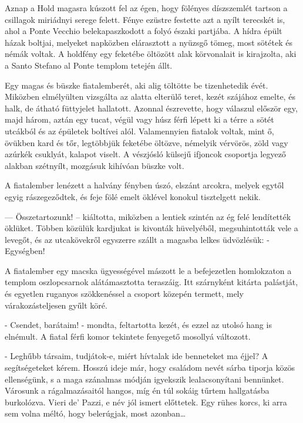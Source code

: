 \documentclass[12pt, a4paper, twoside]{report}
\theoremstyle{definition}
\theoremstyle{remark}
\begin{document}
Aznap  a  Hold  magasra  kúszott  fel  az  égen,  hogy  fölényes 
díszszemlét tartson a csillagok miriádnyi serege felett. Fénye ezüstre 
festette  azt  a  nyílt  terecskét  is,  ahol  a  Ponte  Vecchio 
belekapaszkodott a folyó északi partjába. A hídra épült házak boltjai, 
melyeket napközben elárasztott a nyüzsgő tömeg, most sötétek és 
némák voltak. A holdfény egy feketébe öltözött alak körvonalait is 
kirajzolta, aki a Santo Stefano al Ponte templom tetején állt. 

Egy magas és büszke fiatalemberét, aki alig töltötte be tizenhetedik évét. 
Miközben  elmélyülten  vizsgálta  az  alatta  elterülő  teret,  kezét 
szájához  emelte,  és  halk,  de  átható  füttyjelet  hallatott.  Azonnal 
észrevette, hogy válaszul először egy, majd három, aztán egy tucat, 
végül vagy húsz férfi lépett ki a térre a sötét utcákból és az épületek 
boltívei alól. Valamennyien fiatalok voltak, mint ő, övükben kard és 
tőr,  legtöbbjük  feketébe  öltözve,  némelyik  vérvörös,  zöld  vagy 
azúrkék  csuklyát,  kalapot  viselt.  A  vészjósló  külsejű  ifjoncok 
csoportja legyező alakban szétnyílt, mozgásuk kihívóan büszke volt. 

A  fiatalember  lenézett a halvány  fényben úszó, elszánt arcokra, 
melyek  egytől  egyig  rászegeződtek,  és  feje  fölé  emelt  öklével 
konokul tisztelgett nekik. 

— Összetartozunk! -- kiáltotta, miközben a  lentiek  szintén az ég 
felé  lendítették  öklüket.  Többen  közülük  kardjukat  is  kivonták 
hüvelyéből,  megsuhintották  vele  a  levegőt,  és  az  utcakövekről 
egyszerre szállt a magasba lelkes üdvözlésük: - Egységben! 

A fiatalember egy macska ügyességével mászott le a befejezetlen 
homlokzaton a templom oszlopcsarnok alátámasztotta teraszáig. Itt 
szárnyként  kitárta  palástját,  és  egyetlen  ruganyos  szökkenéssel  a 
csoport közepén termett, mely várakozásteljesen gyűlt köré. 

- Csendet, barátaim! - mondta, feltartotta kezét, és ezzel az utolsó 
hang is elnémult. A fiatal férfi komor tekintete fenyegető mosollyá 
változott. 

- Leghűbb társaim, tudjátok-e, miért hívtalak ide benneteket ma 
éjjel?  A  segítségeteket  kérem.  Hosszú  ideje  már,  hogy  családom 
nevét sárba tiporja közös ellenségünk, s a maga szánalmas módján 
igyekszik  lealacsonyítani  bennünket.  Városunk  a  rágalmazásaitól 
hangos, míg én túl sokáig tűrtem hallgatásba burkolózva. Vieri de' 
Pazzi, e név jól ismert előttetek. Egy rühes korcs, ki arra sem volna 
méltó, hogy belerúgjak, most azonban\dots
\end{document}
